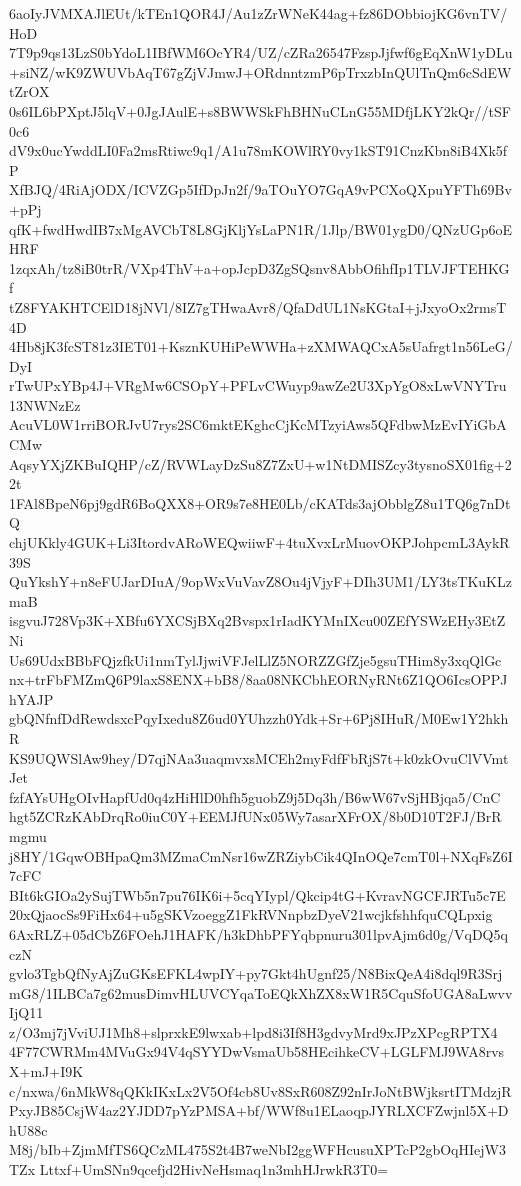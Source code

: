 6aoIyJVMXAJlEUt/kTEn1QOR4J/Au1zZrWNeK44ag+fz86DObbiojKG6vnTV/HoD
7T9p9qs13LzS0bYdoL1IBfWM6OcYR4/UZ/cZRa26547FzspJjfwf6gEqXnW1yDLu
+siNZ/wK9ZWUVbAqT67gZjVJmwJ+ORdnntzmP6pTrxzbInQUlTnQm6cSdEWtZrOX
0s6IL6bPXptJ5lqV+0JgJAulE+s8BWWSkFhBHNuCLnG55MDfjLKY2kQr//tSF0c6
dV9x0ucYwddLI0Fa2msRtiwc9q1/A1u78mKOWlRY0vy1kST91CnzKbn8iB4Xk5fP
XfBJQ/4RiAjODX/ICVZGp5IfDpJn2f/9aTOuYO7GqA9vPCXoQXpuYFTh69Bv+pPj
qfK+fwdHwdIB7xMgAVCbT8L8GjKljYsLaPN1R/1Jlp/BW01ygD0/QNzUGp6oEHRF
1zqxAh/tz8iB0trR/VXp4ThV+a+opJcpD3ZgSQsnv8AbbOfihfIp1TLVJFTEHKGf
tZ8FYAKHTCElD18jNVl/8IZ7gTHwaAvr8/QfaDdUL1NsKGtaI+jJxyoOx2rmsT4D
4Hb8jK3fcST81z3IET01+KsznKUHiPeWWHa+zXMWAQCxA5sUafrgt1n56LeG/DyI
rTwUPxYBp4J+VRgMw6CSOpY+PFLvCWuyp9awZe2U3XpYgO8xLwVNYTru13NWNzEz
AcuVL0W1rriBORJvU7rys2SC6mktEKghcCjKcMTzyiAws5QFdbwMzEvIYiGbACMw
AqsyYXjZKBuIQHP/cZ/RVWLayDzSu8Z7ZxU+w1NtDMISZcy3tysnoSX01fig+22t
1FAl8BpeN6pj9gdR6BoQXX8+OR9s7e8HE0Lb/cKATds3ajObblgZ8u1TQ6g7nDtQ
chjUKkly4GUK+Li3ItordvARoWEQwiiwF+4tuXvxLrMuovOKPJohpcmL3AykR39S
QuYkshY+n8eFUJarDIuA/9opWxVuVavZ8Ou4jVjyF+DIh3UM1/LY3tsTKuKLzmaB
isgvuJ728Vp3K+XBfu6YXCSjBXq2Bvspx1rIadKYMnIXcu00ZEfYSWzEHy3EtZNi
Us69UdxBBbFQjzfkUi1nmTylJjwiVFJelLlZ5NORZZGfZje5gsuTHim8y3xqQlGc
nx+trFbFMZmQ6P9laxS8ENX+bB8/8aa08NKCbhEORNyRNt6Z1QO6IcsOPPJhYAJP
gbQNfnfDdRewdsxcPqyIxedu8Z6ud0YUhzzh0Ydk+Sr+6Pj8IHuR/M0Ew1Y2hkhR
KS9UQWSlAw9hey/D7qjNAa3uaqmvxsMCEh2myFdfFbRjS7t+k0zkOvuClVVmtJet
fzfAYsUHgOIvHapfUd0q4zHiHlD0hfh5guobZ9j5Dq3h/B6wW67vSjHBjqa5/CnC
hgt5ZCRzKAbDrqRo0iuC0Y+EEMJfUNx05Wy7asarXFrOX/8b0D10T2FJ/BrRmgmu
j8HY/1GqwOBHpaQm3MZmaCmNsr16wZRZiybCik4QInOQe7cmT0l+NXqFsZ6I7cFC
BIt6kGIOa2ySujTWb5n7pu76IK6i+5cqYIypl/Qkcip4tG+KvravNGCFJRTu5c7E
20xQjaocSs9FiHx64+u5gSKVzoeggZ1FkRVNnpbzDyeV21wcjkfshhfquCQLpxig
6AxRLZ+05dCbZ6FOehJ1HAFK/h3kDhbPFYqbpnuru301lpvAjm6d0g/VqDQ5qczN
gvlo3TgbQfNyAjZuGKsEFKL4wpIY+py7Gkt4hUgnf25/N8BixQeA4i8dql9R3Srj
mG8/1ILBCa7g62musDimvHLUVCYqaToEQkXhZX8xW1R5CquSfoUGA8aLwvvIjQ11
z/O3mj7jVviUJ1Mh8+slprxkE9lwxab+lpd8i3If8H3gdvyMrd9xJPzXPcgRPTX4
4F77CWRMm4MVuGx94V4qSYYDwVsmaUb58HEcihkeCV+LGLFMJ9WA8rvsX+mJ+I9K
c/nxwa/6nMkW8qQKkIKxLx2V5Of4cb8Uv8SxR608Z92nIrJoNtBWjksrtITMdzjR
PxyJB85CsjW4az2YJDD7pYzPMSA+bf/WWf8u1ELaoqpJYRLXCFZwjnl5X+DhU88c
M8j/bIb+ZjmMfTS6QCzML475S2t4B7weNbI2ggWFHcusuXPTcP2gbOqHIejW3TZx
Lttxf+UmSNn9qcefjd2HivNeHsmaq1n3mhHJrwkR3T0=
